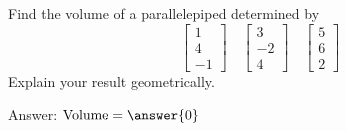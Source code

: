 \documentclass{ximera}
\begin{document}
\begin{problem}\label{prob:volparallelepiped0}
Find the volume of a parallelepiped determined by 
$$\begin{bmatrix}1\\4\\-1\end{bmatrix}\quad\begin{bmatrix}3\\-2\\4\end{bmatrix}\quad\begin{bmatrix}5\\6\\2\end{bmatrix}$$
Explain your result geometrically.

Answer: $\mbox{Volume}=\answer{0}$
\end{problem}
\end{document}
